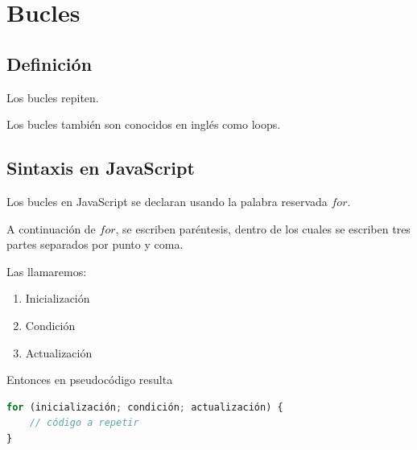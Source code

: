 \documentclass[../principal.tex]{subfiles}
\begin{document}
\chapter{Bucles}

\section{Definición}

Los bucles repiten.

Los bucles también son conocidos en inglés como loops.

\section{Sintaxis en JavaScript}

Los bucles en JavaScript se declaran usando la palabra reservada $for$.

A continuación de $for$, se escriben paréntesis, dentro de los cuales se escriben tres partes separados por punto y coma.

Las llamaremos:

\begin{enumerate}
    \item Inicialización
    \item Condición
    \item Actualización
\end{enumerate}

Entonces en pseudocódigo resulta

\begin{lstlisting}[language=JavaScript]
for (inicialización; condición; actualización) {
    // código a repetir
}
\end{lstlisting}
\end{document}
